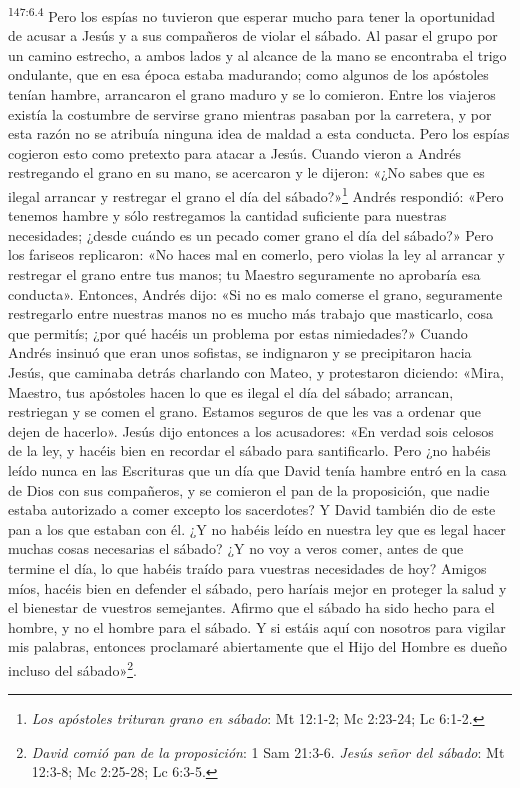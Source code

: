 \par 
\textsuperscript{147:6.4} Pero los espías no tuvieron que esperar mucho para tener la oportunidad de acusar a Jesús y a sus compañeros de violar el sábado. Al pasar el grupo por un camino estrecho, a ambos lados y al alcance de la mano se encontraba el trigo ondulante, que en esa época estaba madurando; como algunos de los apóstoles tenían hambre, arrancaron el grano maduro y se lo comieron. Entre los viajeros existía la costumbre de servirse grano mientras pasaban por la carretera, y por esta razón no se atribuía ninguna idea de maldad a esta conducta. Pero los espías cogieron esto como pretexto para atacar a Jesús. Cuando vieron a Andrés restregando el grano en su mano, se acercaron y le dijeron: «¿No sabes que es ilegal arrancar y restregar el grano el día del sábado?»\footnote{\textit{Los apóstoles trituran grano en sábado}: Mt 12:1-2; Mc 2:23-24; Lc 6:1-2.} Andrés respondió: «Pero tenemos hambre y sólo restregamos la cantidad suficiente para nuestras necesidades; ¿desde cuándo es un pecado comer grano el día del sábado?» Pero los fariseos replicaron: «No haces mal en comerlo, pero violas la ley al arrancar y restregar el grano entre tus manos; tu Maestro seguramente no aprobaría esa conducta». Entonces, Andrés dijo: «Si no es malo comerse el grano, seguramente restregarlo entre nuestras manos no es mucho más trabajo que masticarlo, cosa que permitís; ¿por qué hacéis un problema por estas nimiedades?» Cuando Andrés insinuó que eran unos sofistas, se indignaron y se precipitaron hacia Jesús, que caminaba detrás charlando con Mateo, y protestaron diciendo: «Mira, Maestro, tus apóstoles hacen lo que es ilegal el día del sábado; arrancan, restriegan y se comen el grano. Estamos seguros de que les vas a ordenar que dejen de hacerlo». Jesús dijo entonces a los acusadores: «En verdad sois celosos de la ley, y hacéis bien en recordar el sábado para santificarlo. Pero ¿no habéis leído nunca en las Escrituras que un día que David tenía hambre entró en la casa de Dios con sus compañeros, y se comieron el pan de la proposición, que nadie estaba autorizado a comer excepto los sacerdotes? Y David también dio de este pan a los que estaban con él. ¿Y no habéis leído en nuestra ley que es legal hacer muchas cosas necesarias el sábado? ¿Y no voy a veros comer, antes de que termine el día, lo que habéis traído para vuestras necesidades de hoy? Amigos míos, hacéis bien en defender el sábado, pero haríais mejor en proteger la salud y el bienestar de vuestros semejantes. Afirmo que el sábado ha sido hecho para el hombre, y no el hombre para el sábado. Y si estáis aquí con nosotros para vigilar mis palabras, entonces proclamaré abiertamente que el Hijo del Hombre es dueño incluso del sábado»\footnote{\textit{David comió pan de la proposición}: 1 Sam 21:3-6. \textit{Jesús señor del sábado}: Mt 12:3-8; Mc 2:25-28; Lc 6:3-5.}.

